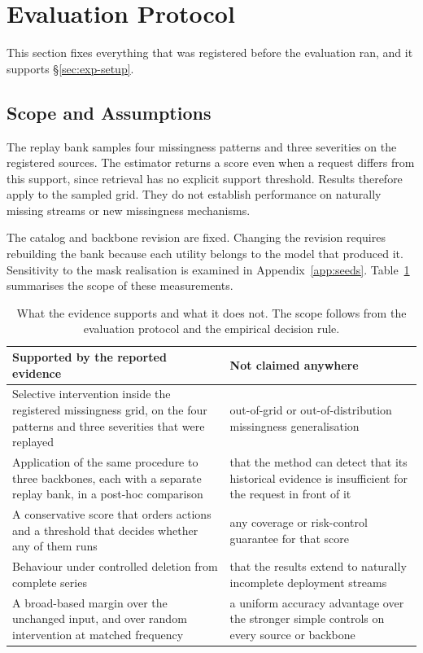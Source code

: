 \documentclass{article}
\begin{document}
\section{Evaluation Protocol}
\label{app:protocol}

This section fixes everything that was registered before the evaluation ran, and it
supports \S\ref{sec:exp-setup}.

\subsection{Scope and Assumptions}
\label{app:scope}
The replay bank samples four missingness patterns and three severities on the registered
sources. The estimator returns a score even when a request differs from this support, since
retrieval has no explicit support threshold. Results therefore apply to the sampled grid.
They do not establish performance on naturally missing streams or new missingness mechanisms.

The catalog and backbone revision are fixed. Changing the revision requires rebuilding the
bank because each utility belongs to the model that produced it. Sensitivity to the mask
realisation is examined in Appendix~\ref{app:seeds}.
Table~\ref{tab:app-claims} summarises the scope of these measurements.

\begin{table}[htbp]
  \caption{What the evidence supports and what it does not. The scope follows from the evaluation protocol and the empirical decision rule.}
  \label{tab:app-claims}
  \centering
  \small
  \setlength{\tabcolsep}{4pt}
\begin{tabular}{@{}p{} p{}@{}}
    \toprule
    Supported by the reported evidence & Not claimed anywhere \\
    \midrule
    Selective intervention inside the registered missingness grid, on the four patterns and three severities that were replayed & out-of-grid or out-of-distribution missingness generalisation \\
    Application of the same procedure to three backbones, each with a separate replay bank, in a post-hoc comparison & that the method can detect that its historical evidence is insufficient for the request in front of it \\
    A conservative score that orders actions and a threshold that decides whether any of them runs & any coverage or risk-control guarantee for that score \\
    Behaviour under controlled deletion from complete series & that the results extend to naturally incomplete deployment streams \\
    A broad-based margin over the unchanged input, and over random intervention at matched frequency & a uniform accuracy advantage over the stronger simple controls on every source or backbone \\
    \bottomrule
  \end{tabular}
\end{table}
\end{document}
